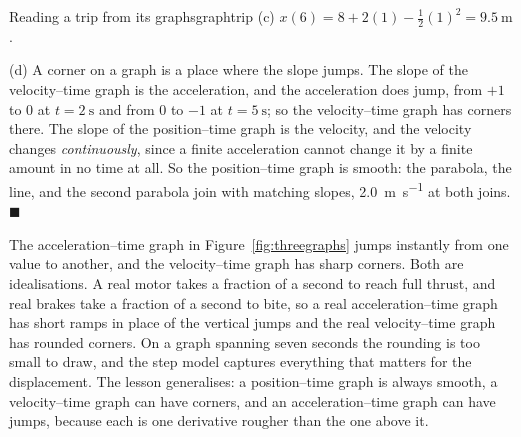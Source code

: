 \documentclass[11pt,twoside,openany]{book}
\newcommand{\qed}{\hfill$\blacksquare$}
\begin{document}
\begin{example}{Reading a trip from its graphs}{graphtrip}
(c) $x(6) = 8 + 2(1) - \tfrac12(1)^2 = \SI{9.5}{\metre}$.

(d) A corner on a graph is a place where the slope jumps. The slope of the velocity--time graph is the acceleration, and the acceleration does jump, from $+1$ to $0$ at $t = \SI{2}{\second}$ and from $0$ to $-1$ at $t = \SI{5}{\second}$; so the velocity--time graph has corners there. The slope of the position--time graph is the velocity, and the velocity changes \emph{continuously}, since a finite acceleration cannot change it by a finite amount in no time at all. So the position--time graph is smooth: the parabola, the line, and the second parabola join with matching slopes, \SI{2.0}{\metre\per\second} at both joins.\qed
\end{example}

\begin{modelnote}
The acceleration--time graph in Figure~\ref{fig:threegraphs} jumps instantly from one value to another, and the velocity--time graph has sharp corners. Both are idealisations. A real motor takes a fraction of a second to reach full thrust, and real brakes take a fraction of a second to bite, so a real acceleration--time graph has short ramps in place of the vertical jumps and the real velocity--time graph has rounded corners. On a graph spanning seven seconds the rounding is too small to draw, and the step model captures everything that matters for the displacement. The lesson generalises: a position--time graph is always smooth, a velocity--time graph can have corners, and an acceleration--time graph can have jumps, because each is one derivative rougher than the one above it.
\end{modelnote}
\end{document}
